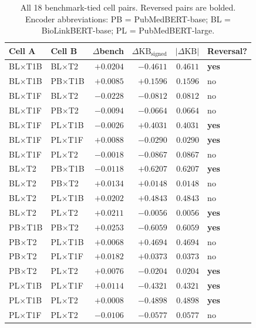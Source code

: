 \begin{table}[H]
\centering
\caption{All 18 benchmark-tied cell pairs. Reversed pairs are bolded.
Encoder abbreviations: PB = PubMedBERT-base; BL = BioLinkBERT-base;
PL = PubMedBERT-large.}
\label{tab:s8-pairs}
\small
\begin{tabular}{@{}llrrrl@{}}
\toprule
\textbf{Cell A} & \textbf{Cell B} & \textbf{$\Delta$bench} & \textbf{$\Delta\text{KB}_{\text{signed}}$} & \textbf{$|\Delta\text{KB}|$} & \textbf{Reversal?} \\
\midrule
BL$\times$T1B & BL$\times$T2  & $+0.0204$ & $-0.4611$ & $0.4611$ & \textbf{yes} \\
BL$\times$T1B & PB$\times$T1B & $+0.0085$ & $+0.1596$ & $0.1596$ & no  \\
BL$\times$T1F & BL$\times$T2  & $-0.0228$ & $-0.0812$ & $0.0812$ & no  \\
BL$\times$T1F & PB$\times$T2  & $-0.0094$ & $-0.0664$ & $0.0664$ & no  \\
BL$\times$T1F & PL$\times$T1B & $-0.0026$ & $+0.4031$ & $0.4031$ & \textbf{yes} \\
BL$\times$T1F & PL$\times$T1F & $+0.0088$ & $-0.0290$ & $0.0290$ & \textbf{yes} \\
BL$\times$T1F & PL$\times$T2  & $-0.0018$ & $-0.0867$ & $0.0867$ & no  \\
BL$\times$T2  & PB$\times$T1B & $-0.0118$ & $+0.6207$ & $0.6207$ & \textbf{yes} \\
BL$\times$T2  & PB$\times$T2  & $+0.0134$ & $+0.0148$ & $0.0148$ & no  \\
BL$\times$T2  & PL$\times$T1B & $+0.0202$ & $+0.4843$ & $0.4843$ & no  \\
BL$\times$T2  & PL$\times$T2  & $+0.0211$ & $-0.0056$ & $0.0056$ & \textbf{yes} \\
PB$\times$T1B & PB$\times$T2  & $+0.0253$ & $-0.6059$ & $0.6059$ & \textbf{yes} \\
PB$\times$T2  & PL$\times$T1B & $+0.0068$ & $+0.4694$ & $0.4694$ & no  \\
PB$\times$T2  & PL$\times$T1F & $+0.0182$ & $+0.0373$ & $0.0373$ & no  \\
PB$\times$T2  & PL$\times$T2  & $+0.0076$ & $-0.0204$ & $0.0204$ & \textbf{yes} \\
PL$\times$T1B & PL$\times$T1F & $+0.0114$ & $-0.4321$ & $0.4321$ & \textbf{yes} \\
PL$\times$T1B & PL$\times$T2  & $+0.0008$ & $-0.4898$ & $0.4898$ & \textbf{yes} \\
PL$\times$T1F & PL$\times$T2  & $-0.0106$ & $-0.0577$ & $0.0577$ & no  \\
\bottomrule
\end{tabular}
\end{table}

